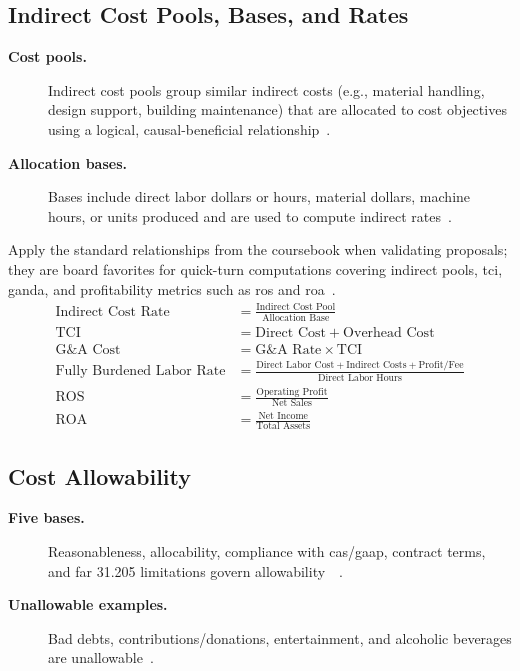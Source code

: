 \documentclass[../main.tex]{subfiles}
\begin{document}
\subsection{Indirect Cost Pools, Bases, and Rates}
\begin{description}
  \item[\textbf{Cost pools.}] Indirect cost pools group similar indirect costs (e.g., material handling, design support, building maintenance) that are allocated to cost objectives using a logical, causal-beneficial relationship~\autocite{edo-3-2-4-cost-price-evaluation-2025}.
  \item[\textbf{Allocation bases.}] Bases include direct labor dollars or hours, material dollars, machine hours, or units produced and are used to compute indirect rates~\autocite{edo-3-2-4-cost-price-evaluation-2025}.
\end{description}

Apply the standard relationships from the coursebook when validating proposals; they are board favorites for quick-turn computations covering indirect pools, \ac{tci}, \ac{ganda}, and profitability metrics such as \ac{ros} and \ac{roa}~\autocite{edo-3-2-4-cost-price-evaluation-2025}.
\begin{align*}
  \text{Indirect Cost Rate}        & = \frac{\text{Indirect Cost Pool}}{\text{Allocation Base}}                                                \\
  \text{TCI}                       & = \text{Direct Cost} + \text{Overhead Cost}                                                                \\
  \text{G\&A Cost}                 & = \text{G\&A Rate} \times \text{TCI}                                                                        \\
  \text{Fully Burdened Labor Rate} & = \frac{\text{Direct Labor Cost} + \text{Indirect Costs} + \text{Profit/Fee}}{\text{Direct Labor Hours}} \\
  \text{ROS}                       & = \frac{\text{Operating Profit}}{\text{Net Sales}}                                                         \\
  \text{ROA}                       & = \frac{\text{Net Income}}{\text{Total Assets}}
\end{align*}

\subsection{Cost Allowability}
\begin{description}
  \item[\textbf{Five bases.}] Reasonableness, allocability, compliance with \ac{cas}/\ac{gaap}, contract terms, and \ac{far} 31.205 limitations govern allowability~\autocite[\S~31.201-2]{FAR}~\autocite{edo-3-2-4-cost-price-evaluation-2025}.
  \item[\textbf{Unallowable examples.}] Bad debts, contributions/donations, entertainment, and alcoholic beverages are unallowable~\autocite{edo-3-2-4-cost-price-evaluation-2025}.
\end{description}
\end{document}
